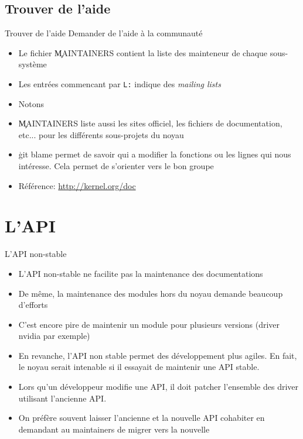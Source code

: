 \subsection{Trouver de l'aide}

\begin{frame}[fragile=singleslide]{Trouver de l'aide}
  Demander de l'aide à la communauté
  \begin{itemize}
  \item Le fichier \c{MAINTAINERS} contient la liste des mainteneur de
    chaque sous-système
  \item  Les entrées  commencant par  \texttt{L:} indique  des \emph{mailing
    lists}
  \item Notons 
  \item \c{MAINTAINERS}  liste aussi les sites  officiel, les fichiers
    de  documentation,  etc...  pour  les  différents sous-projets  du
    noyau
  \item \c{git blame} permet de  savoir qui a modifier la fonctions ou
    les lignes qui  nous intéresse. Cela permet de  s'orienter vers le
    bon groupe
  \item Référence: \url{http://kernel.org/doc}
  \end{itemize}
\end{frame} 

\section{L'API}

\begin{frame}[fragile=singleslide]{L'API non-stable}
  \begin{itemize} 
  \item  L'API   non-stable  ne   facilite  pas  la   maintenance  des
    documentations
  \item  De même,  la maintenance  des modules  hors du  noyau demande
    beaucoup d'efforts
  \item  C'est  encore pire  de  maintenir  un  module pour  plusieurs
    versions (driver nvidia par exemple)
  \item En  revanche, l'API non  stable permet des  développement plus
    agiles. En fait, le noyau serait intenable si il essayait de maintenir une API stable.
  \item  Lors  qu'un développeur  modifie  une  API,  il doit  patcher
    l'ensemble des driver utilisant l'ancienne API.
  \item  On préfère  souvent  laisser l'ancienne  et  la nouvelle  API
    cohabiter en demandant au maintainers de migrer vers la nouvelle
  \end{itemize}
\end{frame}

